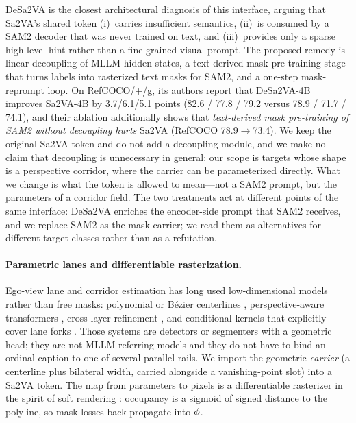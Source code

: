 DeSa2VA \citep{dang2025desa2va} is the closest architectural diagnosis of this interface, arguing that Sa2VA's shared \Seg{} token (i)~carries insufficient semantics, (ii)~is consumed by a SAM2 decoder that was never trained on text, and (iii)~provides only a sparse high-level hint rather than a fine-grained visual prompt.
The proposed remedy is linear decoupling of MLLM hidden states, a text-derived mask pre-training stage that turns labels into rasterized text masks for SAM2, and a one-step mask-reprompt loop.
On RefCOCO/+/g, its authors report that DeSa2VA-4B improves Sa2VA-4B by 3.7/6.1/5.1 points (82.6 / 77.8 / 79.2 versus 78.9 / 71.7 / 74.1), and their ablation additionally shows that \emph{text-derived mask pre-training of SAM2 without decoupling hurts} Sa2VA (RefCOCO 78.9$\to$73.4).
We keep the original Sa2VA token and do not add a decoupling module, and we make no claim that decoupling is unnecessary in general: our scope is targets whose shape is a perspective corridor, where the carrier can be parameterized directly.
What we change is what the token is allowed to mean---not a SAM2 prompt, but the parameters of a corridor field.
The two treatments act at different points of the same interface: DeSa2VA enriches the encoder-side prompt that SAM2 receives, and we replace SAM2 as the mask carrier; we read them as alternatives for different target classes rather than as a refutation.

\paragraph{Parametric lanes and differentiable rasterization.}
Ego-view lane and corridor estimation has long used low-dimensional models rather than free masks: polynomial or B\'ezier centerlines \citep{tabelini2021polylanenet,feng2022bezierlanenet}, perspective-aware transformers \citep{chen2022persformer}, cross-layer refinement \citep{zheng2022clrnet}, and conditional kernels that explicitly cover lane forks \citep{liu2021condlanenet}.
Those systems are detectors or segmenters with a geometric head; they are not MLLM referring models and they do not have to bind an ordinal caption to one of several parallel rails.
We import the geometric \emph{carrier} (a centerline plus bilateral width, carried alongside a vanishing-point slot) into a Sa2VA \Seg{} token.
The map from parameters to pixels is a differentiable rasterizer in the spirit of soft rendering \citep{kato2018renderer,liu2019softras}: occupancy is a sigmoid of signed distance to the polyline, so mask losses back-propagate into $\phi$.

